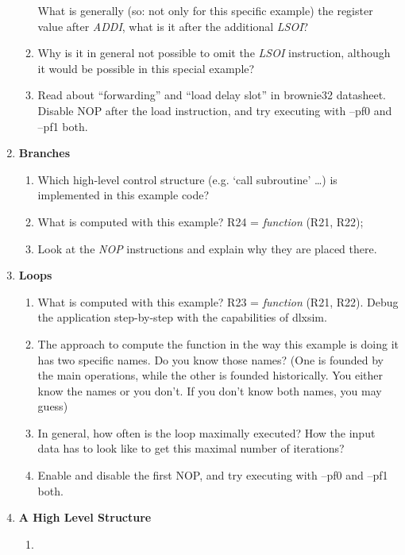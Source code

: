 \begin{enumerate}[start=0]
\begin{enumerate}[label=(\alph*)]
	What is generally (so: not only for this specific example) the
	register value after \emph{ADDI}, what is it after the additional
	\emph{LSOI}?
	\color{red}\item\normalcolor
	Why is it in general not possible to omit the \emph{LSOI} instruction,
	although it would be possible in this special example?
	\color{red}\item\normalcolor
	Read about ``forwarding'' and ``load delay slot'' in brownie32
	datasheet. Disable NOP after the load instruction, and try executing
	with --pf0 and --pf1 both.
	\end{enumerate}
\item \textbf{Branches}
	\begin{enumerate}[label=(\alph*)]
	\color{red}\item\normalcolor
	Which high-level control structure (e.g. `call subroutine' \ldots) is
	implemented in this example code?
	\color{red}\item\normalcolor
	What is computed with this example? R24 = \emph{function} (R21, R22);
	\color{red}\item\normalcolor
	Look at the \emph{NOP} instructions and explain why they are placed
	there.
	\end{enumerate}
\item \textbf{Loops}
	\begin{enumerate}[label=(\alph*)]
	\color{red}\item\normalcolor 
	What is computed with this example? R23 = \emph{function} (R21, R22).
	Debug the application step-by-step with the capabilities of dlxsim.
	\color{red}\item\normalcolor
	The approach to compute the function in the way this example is doing
	it has two specific names. Do you know those names? (One is founded by
	the main operations, while the other is founded historically. You
	either know the names or you don't. If you don't know both names, you
	may guess)
	\color{red}\item\normalcolor
	In general, how often is the loop maximally executed? How the input
	data has to look like to get this maximal number of iterations?
	\color{red}\item\normalcolor
	Enable and disable the first NOP, and try executing with --pf0 and
	--pf1 both.
	\end{enumerate}
\item \textbf{A High Level Structure}
	\begin{enumerate}[label=(\alph*)]
	\color{red}\item\normalcolor

\end{enumerate}
\end{enumerate}
